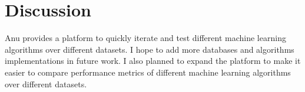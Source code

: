 \documentclass[../main.tex]{subfiles}
\begin{document}
\section{Discussion}

Anu provides a platform to quickly iterate and test different machine learning algorithms over different datasets.
I hope to add more databases and algorithms implementations in future work.
I also planned to expand the platform to make it easier to compare performance metrics of different machine learning algorithms over different datasets.
\end{document}

